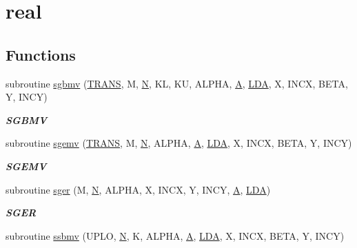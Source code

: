 \hypertarget{group__single__blas__level2}{}\section{real}
\label{group__single__blas__level2}
\subsection*{Functions}
\begin{DoxyCompactItemize}
\item 
subroutine \hyperlink{group__single__blas__level2_ga1677e779273da82f0e61504afd07264e}{sgbmv} (\hyperlink{superlu__enum__consts_8h_a0c4e17b2d5cea33f9991ccc6a6678d62a1f61e3015bfe0f0c2c3fda4c5a0cdf58}{T\+R\+A\+N\+S}, M, \hyperlink{polmisc_8c_a0240ac851181b84ac374872dc5434ee4}{N}, K\+L, K\+U, A\+L\+P\+H\+A, \hyperlink{classA}{A}, \hyperlink{example__user_8c_ae946da542ce0db94dced19b2ecefd1aa}{L\+D\+A}, X, I\+N\+C\+X, B\+E\+T\+A, Y, I\+N\+C\+Y)
\begin{DoxyCompactList}\small\item\em {\bfseries S\+G\+B\+M\+V} \end{DoxyCompactList}\item 
subroutine \hyperlink{group__single__blas__level2_gafc92361b74c6d41c7e5afa0aa5d13ec9}{sgemv} (\hyperlink{superlu__enum__consts_8h_a0c4e17b2d5cea33f9991ccc6a6678d62a1f61e3015bfe0f0c2c3fda4c5a0cdf58}{T\+R\+A\+N\+S}, M, \hyperlink{polmisc_8c_a0240ac851181b84ac374872dc5434ee4}{N}, A\+L\+P\+H\+A, \hyperlink{classA}{A}, \hyperlink{example__user_8c_ae946da542ce0db94dced19b2ecefd1aa}{L\+D\+A}, X, I\+N\+C\+X, B\+E\+T\+A, Y, I\+N\+C\+Y)
\begin{DoxyCompactList}\small\item\em {\bfseries S\+G\+E\+M\+V} \end{DoxyCompactList}\item 
subroutine \hyperlink{group__single__blas__level2_ga408fbda62b1284363c01d7595da11292}{sger} (M, \hyperlink{polmisc_8c_a0240ac851181b84ac374872dc5434ee4}{N}, A\+L\+P\+H\+A, X, I\+N\+C\+X, Y, I\+N\+C\+Y, \hyperlink{classA}{A}, \hyperlink{example__user_8c_ae946da542ce0db94dced19b2ecefd1aa}{L\+D\+A})
\begin{DoxyCompactList}\small\item\em {\bfseries S\+G\+E\+R} \end{DoxyCompactList}\item 
subroutine \hyperlink{group__single__blas__level2_gad8eb1004e944af8112a6e69f668ac53b}{ssbmv} (U\+P\+L\+O, \hyperlink{polmisc_8c_a0240ac851181b84ac374872dc5434ee4}{N}, K, A\+L\+P\+H\+A, \hyperlink{classA}{A}, \hyperlink{example__user_8c_ae946da542ce0db94dced19b2ecefd1aa}{L\+D\+A}, X, I\+N\+C\+X, B\+E\+T\+A, Y, I\+N\+C\+Y)

\end{DoxyCompactItemize}
